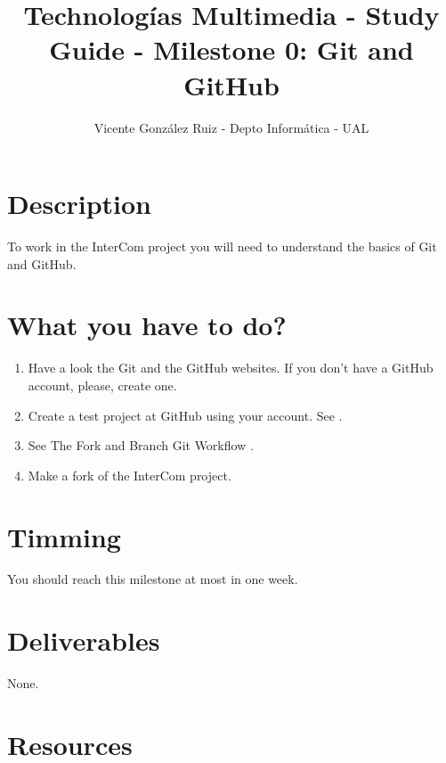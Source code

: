\title{Technologías Multimedia - Study Guide - Milestone 0: Git and GitHub}
\author{Vicente González Ruiz - Depto Informática - UAL}

\maketitle

\section{Description}

To work in the InterCom project \cite{intercom} you will need to
understand the basics of Git and GitHub.

\section{What you have to do?}

\begin{enumerate}
\item Have a look the Git \cite{Git, Git-book} and the GitHub
  \cite{GitHub} websites. If you don't have a GitHub account, please,
  create one.
\item Create a test project at GitHub using your account. See
  \cite{GitHub-HW}.
\item See The Fork and Branch Git Workflow \cite{Git-workflow}.
\item Make a fork of the InterCom \cite{intercom} project. 
\end{enumerate}

\section{Timming}

You should reach this milestone at most in one week.

\section{Deliverables}

None.

\section{Resources}


